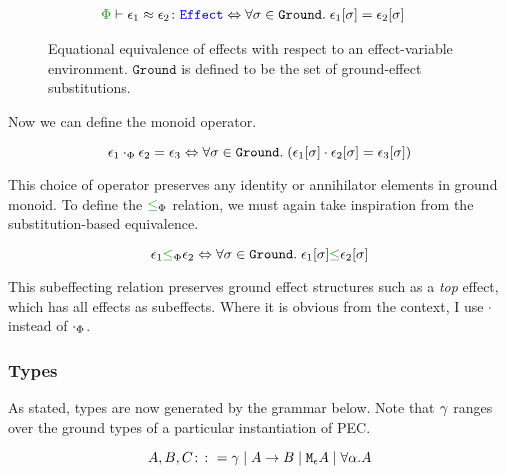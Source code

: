\documentclass{Report}
\newcommand\groundEffects[0]{\texttt{Ground}}
\begin{document}
\begin{figure}[H]
    \centering
    \begin{framed}
        \begin{align}
            \zpberelation{\e_1}{\e_2}{\effect} & \Leftrightarrow \forall \si\in\groundEffects.\s\e_1\ssi = \e_2\ssi
        \end{align}
    \end{framed}
    
    \caption{Equational equivalence of effects with respect to an effect-variable environment. $\groundEffects$ is defined to be the set of ground-effect substitutions.}
    \label{EffectEquivalence}
\end{figure}
Now we can define the monoid operator. 
\begin{framed}
    \begin{definition}
        $$\e_1\dotp\e_2 = \e_3 \Leftrightarrow \forall \si\in\groundEffects.\s (\e_1\ssi \dot \e_2\ssi = \e_3\ssi)$$ 
    \end{definition}
\end{framed}

This choice of operator preserves any identity or annihilator elements in ground monoid. To define the $\subeffectp$ relation, we must again take inspiration from the substitution-based equivalence. 


\begin{framed}
    
\begin{definition}
    $$\e_1\subeffectp\e_2\Leftrightarrow \forall\si\in\groundEffects.\s\e_1\ssi\subeffect\e_2\ssi$$
    
\end{definition}

\end{framed}
This subeffecting relation preserves ground effect structures such as a \textit{top} effect, which has all effects as subeffects. Where it is obvious from the context, I use $\dot$ instead of $\dotp$.


\subsubsection{Types}
As stated, types are now generated by the grammar below. Note that $\g$ ranges over the ground types of a particular instantiation of PEC.

$$ A, B, C \gens \ground \mid \ab \mid \mea \mid \all{\a}{A}$$
  
\end{document}
